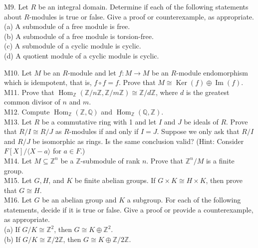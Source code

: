M9. Let $R$ be an integral domain. Determine if each of the following statements about $R$-modules is true or false. Give a proof or counterexample, as appropriate.\\
(a) A submodule of a free module is free.\\
(b) A submodule of a free module is torsion-free.\\
(c) A submodule of a cyclic module is cyclic.\\
(d) A quotient module of a cyclic module is cyclic.

M10. Let $M$ be an $R$-module and let $f: M \rightarrow M$ be an $R$-module endomorphism which is idempotent, that is, $f \circ f=f$. Prove that $M \cong \operatorname{Ker}(f) \oplus \operatorname{Im}(f)$.\\
M11. Prove that $\operatorname{Hom}_{\mathbb{Z}}(\mathbb{Z} / n \mathbb{Z}, \mathbb{Z} / m \mathbb{Z}) \cong \mathbb{Z} / d \mathbb{Z}$, where $d$ is the greatest common divisor of $n$ and $m$.\\
M12. Compute $\operatorname{Hom}_{\mathbb{Z}}(\mathbb{Z}, \mathbb{Q})$ and $\operatorname{Hom}_{\mathbb{Z}}(\mathbb{Q}, \mathbb{Z})$.\\
M13. Let $R$ be a commutative ring with 1 and let $I$ and $J$ be ideals of $R$. Prove that $R / I \cong R / J$ as $R$-modules if and only if $I=J$. Suppose we only ask that $R / I$ and $R / J$ be isomorphic as rings. Is the same conclusion valid? (Hint: Consider $F[X] /\langle X-a\rangle$ for $a \in F$.)\\
M14. Let $M \subseteq \mathbb{Z}^{n}$ be a $\mathbb{Z}$-submodule of rank $n$. Prove that $\mathbb{Z}^{n} / M$ is a finite group.\\
M15. Let $G, H$, and $K$ be finite abelian groups. If $G \times K \cong H \times K$, then prove that $G \cong H$.\\
M16. Let $G$ be an abelian group and $K$ a subgroup. For each of the following statements, decide if it is true or false. Give a proof or provide a counterexample, as appropriate.\\
(a) If $G / K \cong \mathbb{Z}^{2}$, then $G \cong K \oplus \mathbb{Z}^{2}$.\\
(b) If $G / K \cong \mathbb{Z} / 2 \mathbb{Z}$, then $G \cong K \oplus \mathbb{Z} / 2 \mathbb{Z}$.

